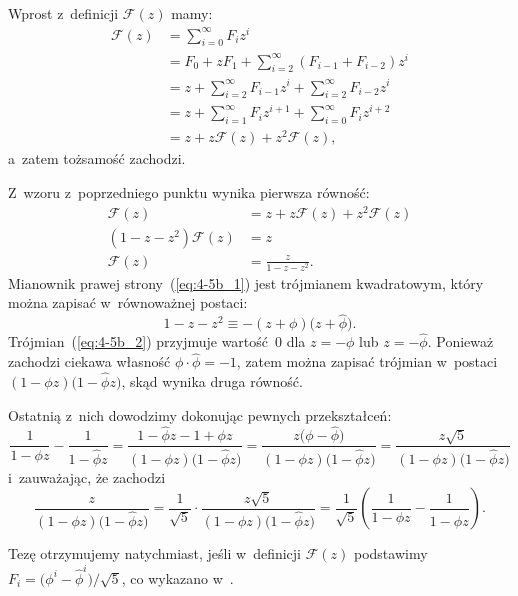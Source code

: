 
\subproblem %
Wprost z~definicji $\mathcal{F}(z)$ mamy:
\begin{align*}
	\mathcal{F}(z) &= \sum_{i=0}^\infty F_iz^i \\
	&= F_0+zF_1+\sum_{i=2}^\infty (F_{i-1}+F_{i-2})z^i \\
	&= z+\sum_{i=2}^\infty F_{i-1}z^i+\sum_{i=2}^\infty F_{i-2}z^i \\
	&= z+\sum_{i=1}^\infty F_iz^{i+1}+\sum_{i=0}^\infty F_iz^{i+2} \\[2mm]
	&= z+z\mathcal{F}(z)+z^2\mathcal{F}(z),
\end{align*}
a~zatem tożsamość zachodzi.

\subproblem %
Z~wzoru z~poprzedniego punktu wynika pierwsza równość:
\begin{align}
	\mathcal{F}(z) &= z+z\mathcal{F}(z)+z^2\mathcal{F}(z) \nonumber \\
	(1-z-z^2)\mathcal{F}(z) &= z \nonumber \\
	\mathcal{F}(z) &= \frac{z}{1-z-z^2}. \label{eq:4-5b_1}
\end{align}
Mianownik prawej strony~(\ref{eq:4-5b_1}) jest trójmianem kwadratowym, który można zapisać w~równoważnej postaci:
\begin{equation}
	1-z-z^2 \equiv -(z+\phi)\bigl(z+\widehat\phi\bigr). \label{eq:4-5b_2}
\end{equation}
Trójmian~(\ref{eq:4-5b_2}) przyjmuje wartość~0 dla $z=-\phi$ lub $z=-\widehat\phi$. Ponieważ zachodzi ciekawa własność $\phi\cdot\widehat\phi=-1$, zatem można zapisać trójmian w~postaci $(1-\phi z)\bigl(1-\widehat\phi z\bigr)$, skąd wynika druga równość.

Ostatnią z~nich dowodzimy dokonując pewnych przekształceń:
\[
	\frac{1}{1-\phi z}-\frac{1}{1-\widehat\phi z} = \frac{1-\widehat\phi z-1+\phi z}{(1-\phi z)\bigl(1-\widehat\phi z\bigr)} = \frac{z\bigl(\phi-\widehat\phi\bigr)}{(1-\phi z)\bigl(1-\widehat\phi z\bigr)} = \frac{z\sqrt{5}}{(1-\phi z)\bigl(1-\widehat\phi z\bigr)}
\]
i~zauważając, że zachodzi
\[
	\frac{z}{(1-\phi z)\bigl(1-\widehat\phi z\bigr)} = \frac{1}{\sqrt{5}}\cdot\frac{z\sqrt{5}}{(1-\phi z)\bigl(1-\widehat\phi z\bigr)} = \frac{1}{\sqrt{5}}\left(\frac{1}{1-\phi z}-\frac{1}{1-\widehat\phi z}\right).
\]

\subproblem %
Tezę otrzymujemy natychmiast, jeśli w~definicji $\mathcal{F}(z)$ podstawimy $F_i=\bigl(\phi^i-\widehat\phi^i\bigr)/\sqrt{5}$, co wykazano w~.

